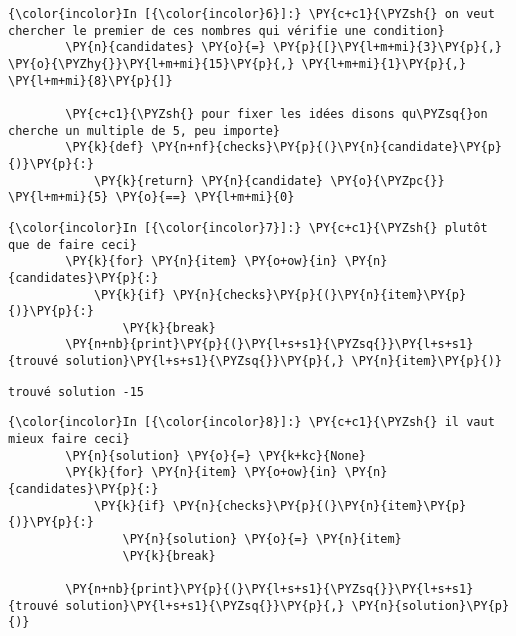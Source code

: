     \begin{Verbatim}[commandchars=\\\{\},frame=single,framerule=0.3mm,rulecolor=\color{cellframecolor}]
{\color{incolor}In [{\color{incolor}6}]:} \PY{c+c1}{\PYZsh{} on veut chercher le premier de ces nombres qui vérifie une condition}
        \PY{n}{candidates} \PY{o}{=} \PY{p}{[}\PY{l+m+mi}{3}\PY{p}{,} \PY{o}{\PYZhy{}}\PY{l+m+mi}{15}\PY{p}{,} \PY{l+m+mi}{1}\PY{p}{,} \PY{l+m+mi}{8}\PY{p}{]}
        
        \PY{c+c1}{\PYZsh{} pour fixer les idées disons qu\PYZsq{}on cherche un multiple de 5, peu importe}
        \PY{k}{def} \PY{n+nf}{checks}\PY{p}{(}\PY{n}{candidate}\PY{p}{)}\PY{p}{:}
            \PY{k}{return} \PY{n}{candidate} \PY{o}{\PYZpc{}} \PY{l+m+mi}{5} \PY{o}{==} \PY{l+m+mi}{0}
\end{Verbatim}


    \begin{Verbatim}[commandchars=\\\{\},frame=single,framerule=0.3mm,rulecolor=\color{cellframecolor}]
{\color{incolor}In [{\color{incolor}7}]:} \PY{c+c1}{\PYZsh{} plutôt que de faire ceci}
        \PY{k}{for} \PY{n}{item} \PY{o+ow}{in} \PY{n}{candidates}\PY{p}{:}
            \PY{k}{if} \PY{n}{checks}\PY{p}{(}\PY{n}{item}\PY{p}{)}\PY{p}{:}
                \PY{k}{break}
        \PY{n+nb}{print}\PY{p}{(}\PY{l+s+s1}{\PYZsq{}}\PY{l+s+s1}{trouvé solution}\PY{l+s+s1}{\PYZsq{}}\PY{p}{,} \PY{n}{item}\PY{p}{)}
\end{Verbatim}


    \begin{Verbatim}[commandchars=\\\{\},frame=single,framerule=0.3mm,rulecolor=\color{cellframecolor}]
trouvé solution -15
\end{Verbatim}

    \begin{Verbatim}[commandchars=\\\{\},frame=single,framerule=0.3mm,rulecolor=\color{cellframecolor}]
{\color{incolor}In [{\color{incolor}8}]:} \PY{c+c1}{\PYZsh{} il vaut mieux faire ceci}
        \PY{n}{solution} \PY{o}{=} \PY{k+kc}{None}
        \PY{k}{for} \PY{n}{item} \PY{o+ow}{in} \PY{n}{candidates}\PY{p}{:}
            \PY{k}{if} \PY{n}{checks}\PY{p}{(}\PY{n}{item}\PY{p}{)}\PY{p}{:}
                \PY{n}{solution} \PY{o}{=} \PY{n}{item}
                \PY{k}{break}
        
        \PY{n+nb}{print}\PY{p}{(}\PY{l+s+s1}{\PYZsq{}}\PY{l+s+s1}{trouvé solution}\PY{l+s+s1}{\PYZsq{}}\PY{p}{,} \PY{n}{solution}\PY{p}{)}
\end{Verbatim}


